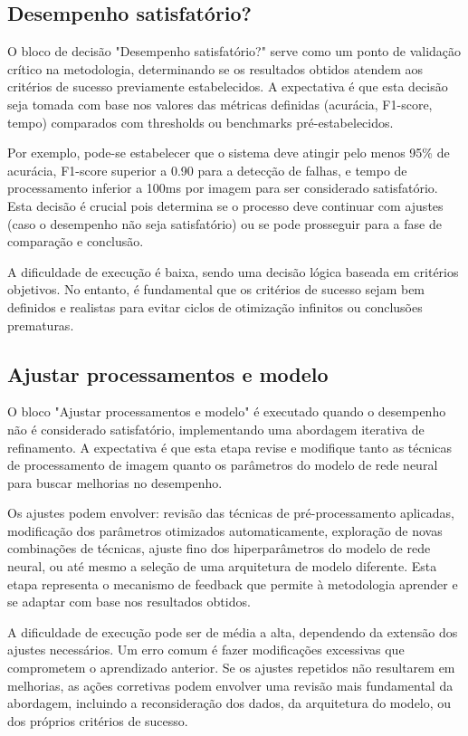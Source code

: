 \subsection{Desempenho satisfatório?}
O bloco de decisão "Desempenho satisfatório?" serve como um ponto de validação crítico na metodologia, determinando se os resultados obtidos atendem aos critérios de sucesso previamente estabelecidos. A expectativa é que esta decisão seja tomada com base nos valores das métricas definidas (acurácia, F1-score, tempo) comparados com thresholds ou benchmarks pré-estabelecidos.

Por exemplo, pode-se estabelecer que o sistema deve atingir pelo menos 95\% de acurácia, F1-score superior a 0.90 para a detecção de falhas, e tempo de processamento inferior a 100ms por imagem para ser considerado satisfatório. Esta decisão é crucial pois determina se o processo deve continuar com ajustes (caso o desempenho não seja satisfatório) ou se pode prosseguir para a fase de comparação e conclusão.

A dificuldade de execução é baixa, sendo uma decisão lógica baseada em critérios objetivos. No entanto, é fundamental que os critérios de sucesso sejam bem definidos e realistas para evitar ciclos de otimização infinitos ou conclusões prematuras.

\subsection{Ajustar processamentos e modelo}
O bloco "Ajustar processamentos e modelo" é executado quando o desempenho não é considerado satisfatório, implementando uma abordagem iterativa de refinamento. A expectativa é que esta etapa revise e modifique tanto as técnicas de processamento de imagem quanto os parâmetros do modelo de rede neural para buscar melhorias no desempenho.

Os ajustes podem envolver: revisão das técnicas de pré-processamento aplicadas, modificação dos parâmetros otimizados automaticamente, exploração de novas combinações de técnicas, ajuste fino dos hiperparâmetros do modelo de rede neural, ou até mesmo a seleção de uma arquitetura de modelo diferente. Esta etapa representa o mecanismo de feedback que permite à metodologia aprender e se adaptar com base nos resultados obtidos.

A dificuldade de execução pode ser de média a alta, dependendo da extensão dos ajustes necessários. Um erro comum é fazer modificações excessivas que comprometem o aprendizado anterior. Se os ajustes repetidos não resultarem em melhorias, as ações corretivas podem envolver uma revisão mais fundamental da abordagem, incluindo a reconsideração dos dados, da arquitetura do modelo, ou dos próprios critérios de sucesso.

